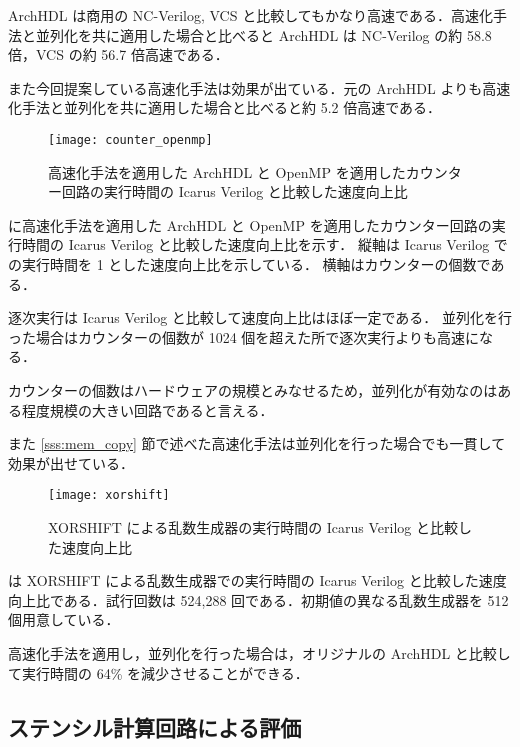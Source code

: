 ArchHDL は商用の NC-Verilog, VCS と比較してもかなり高速である．高速化手法と並列化を共に適用した場合と比べると ArchHDL は NC-Verilog の約 58.8 倍，VCS の約 56.7 倍高速である．

また今回提案している高速化手法は効果が出ている．元の ArchHDL よりも高速化手法と並列化を共に適用した場合と比べると約 5.2 倍高速である．



\begin{figure}[t]
 \centering
 \texttt{[image: counter\_openmp]}
 \caption{高速化手法を適用した ArchHDL と OpenMP を適用したカウンター回路の実行時間の Icarus Verilog と比較した速度向上比}
 \label{fig:counter_con}
\end{figure}

 に高速化手法を適用した ArchHDL と OpenMP を適用したカウンター回路の実行時間の Icarus Verilog と比較した速度向上比を示す．
縦軸は Icarus Verilog での実行時間を 1 とした速度向上比を示している．
横軸はカウンターの個数である．

逐次実行は Icarus Verilog と比較して速度向上比はほぼ一定である．
並列化を行った場合はカウンターの個数が 1024 個を超えた所で逐次実行よりも高速になる．

カウンターの個数はハードウェアの規模とみなせるため，並列化が有効なのはある程度規模の大きい回路であると言える．

また \ref{sss:mem_copy} 節で述べた高速化手法は並列化を行った場合でも一貫して効果が出せている．

\begin{figure}[t]
 \centering
 \texttt{[image: xorshift]}
 \caption{XORSHIFT による乱数生成器の実行時間の Icarus Verilog と比較した速度向上比}
 \label{fig:xorshift}
\end{figure}

 は XORSHIFT による乱数生成器での実行時間の Icarus Verilog と比較した速度向上比である．試行回数は 524,288 回である．初期値の異なる乱数生成器を 512 個用意している．

高速化手法を適用し，並列化を行った場合は，オリジナルの ArchHDL と比較して実行時間の 64\% を減少させることができる．



\subsection{ステンシル計算回路による評価}


